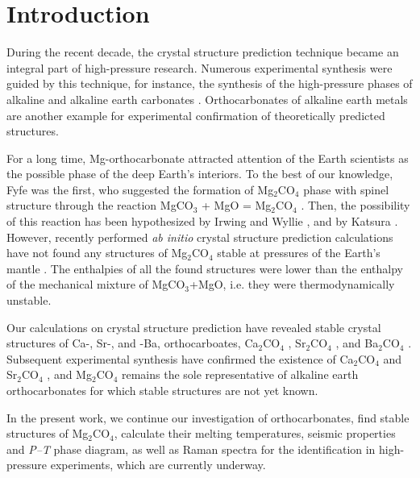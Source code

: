 \documentclass[a4paperm]{article}
\begin{document}
\section*{Introduction}

During the recent decade, the crystal structure prediction technique became an integral part of high-pressure research. 
Numerous experimental synthesis were guided by this technique, for instance, the synthesis of the high-pressure phases of alkaline \cite{gavr2016, gavr2019_alk, grzechnik2003}  and alkaline earth carbonates  \cite{oganov2006, pickard2015, gavr2017_aragII, smith2018, solomatova2017_fedol, binck2020_dol, merlini2017_dol}.
Orthocarbonates of alkaline earth metals are another example for experimental confirmation of theoretically predicted structures.

For a long time, Mg-orthocarbonate attracted attention of the Earth scientists as the possible phase of the deep Earth's interiors.
To the best of our knowledge, Fyfe was the first, who suggested the formation of Mg$_2$CO$_4$ phase  with spinel structure through the reaction MgCO$_3$ + MgO = Mg$_2$CO$_4$  \cite{fyfe1970}.
Then, the possibility of this reaction has been hypothesized by Irwing and Wyllie \cite{irving1973}, and by Katsura \cite{katsura1991_mgco3}.
However, recently performed {\it ab initio} crystal structure prediction calculations have not found any structures of Mg$_2$CO$_4$ stable at pressures of the Earth's mantle \cite{yao2018}.
The enthalpies of all the found structures were lower than the enthalpy of the mechanical mixture of MgCO$_3$+MgO, i.e. they were thermodynamically unstable.

Our calculations on crystal structure prediction have revealed stable crystal structures of Ca-, Sr-, and -Ba, orthocarboates, Ca$_2$CO$_4$ \cite{sagatova2020_ortho}, Sr$_2$CO$_4$ \cite{gavr2020_htxrd}, and Ba$_2$CO$_4$ \cite{gavr2020_htxrd}. 
Subsequent experimental synthesis have confirmed the existence of Ca$_2$CO$_4$ and Sr$_2$CO$_4$ \cite{laniel2021_sr2co4,binck2021_ca2co4}, and Mg$_2$CO$_4$ remains the sole representative of alkaline earth orthocarbonates for which stable structures are not yet known.

In the present work, we continue our investigation of orthocarbonates, find stable structures of Mg$_2$CO$_4$, calculate their melting temperatures, seismic properties and {\it P--T} phase diagram, as well as Raman spectra for the identification in high-pressure experiments, which are currently underway.
\end{document}
